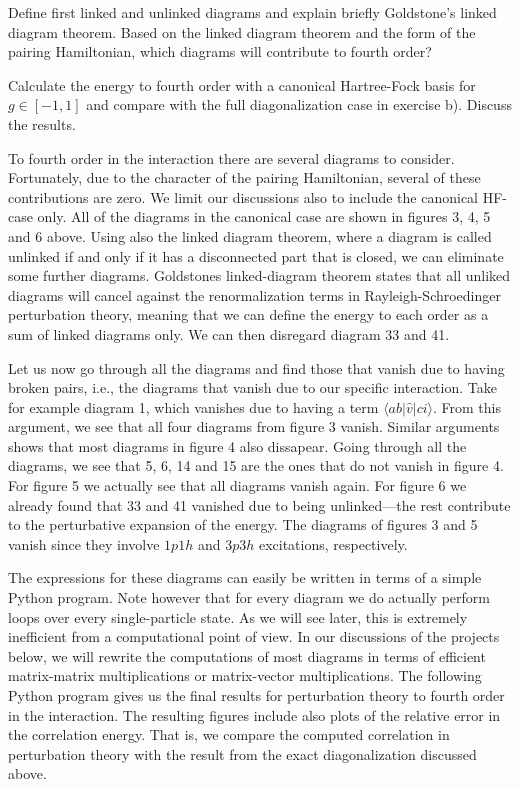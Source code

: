 \begin{prob}
\begin{enumerate}
Define first linked and unlinked diagrams and explain briefly Goldstone's linked diagram theorem.
Based on the linked diagram theorem and the form of the pairing Hamiltonian, which diagrams will contribute
to fourth order?

Calculate the energy to fourth order with a canonical Hartree-Fock basis for $g\in [-1,1]$ and compare
with the full diagonalization case in exercise b). Discuss the results.
\end{enumerate}


To fourth order in the interaction there are several diagrams to consider.
Fortunately, due to the character of the pairing Hamiltonian, several of these contributions are
zero. We limit our discussions also to include the
canonical HF-case only.
All of the diagrams in the canonical case are
shown in figures 3, 4, 5 and 6 above.
Using also the linked diagram theorem, where a
diagram is called unlinked if and only if it has a disconnected part
that is closed, we can eliminate some further  diagrams. Goldstones
linked-diagram theorem states that all unliked diagrams will cancel
against the renormalization terms in Rayleigh-Schroedinger perturbation theory,
meaning that we can define
the energy to each order as a sum of linked diagrams
only. We can then disregard diagram 33 and 41.

Let us now go through all the diagrams and find those that vanish due
to having broken pairs, i.e., the diagrams that vanish due to our
specific interaction. Take for example diagram 1, which vanishes due
to having a term $\langle ab\vert \hat{v} \vert ci\rangle$. From this
argument, we see that all four diagrams from figure 3 vanish. Similar
arguments shows that most diagrams in figure 4 also dissapear. Going
through all the diagrams, we see that 5, 6, 14 and 15 are the ones
that do not vanish in figure 4. For figure 5 we actually see that all
diagrams vanish again. For figure 6 we already found that 33 and 41
vanished due to being unlinked---the rest contribute to the perturbative expansion of the
energy.
The diagrams of figures 3 and 5 vanish since they involve $1p1h$ and $3p3h$ excitations, respectively.

The expressions for these diagrams can easily be written in terms of a
simple Python program. Note however that for every diagram we do
actually perform loops over every single-particle state. As we will
see later, this is extremely inefficient from a computational point
of view. In our discussions of the projects below, we will rewrite the
computations of most diagrams in terms of efficient matrix-matrix
multiplications or matrix-vector multiplications.  The following
Python program gives us the final results for perturbation theory to fourth
order in the interaction. The resulting figures include also plots of the relative error in the
correlation energy. That is, we compare the computed correlation in
perturbation theory with the result from the exact diagonalization discussed above.


\end{prob}
